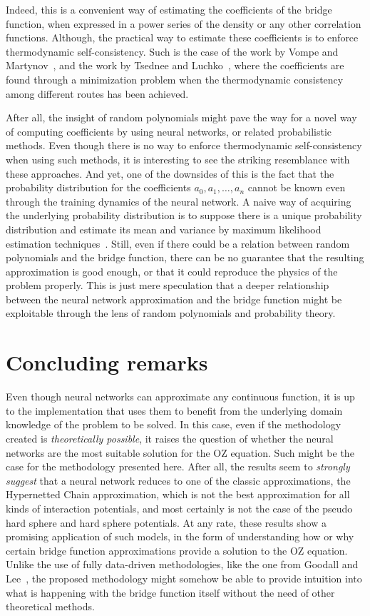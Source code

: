 Indeed, this is a convenient way of estimating the coefficients of the bridge function,
when expressed in a power series of the density or any other correlation functions.
Although, the practical way to estimate these coefficients is to enforce thermodynamic
self-consistency. Such is the case of the work by Vompe and Martynov~\cite{vompeBridgeFunctionExpansion1994},
and the work by Tsednee and Luchko~\cite{tsedneeClosureOrnsteinZernikeEquation2019}, where
the coefficients are found through a minimization problem when the thermodynamic consistency
among different routes has been achieved.

After all, the insight of random polynomials might pave the way for a novel way of 
computing coefficients by using neural networks, or related probabilistic methods.
Even though there is no way to enforce thermodynamic self-consistency when using such
methods, it is interesting to see the striking resemblance with these approaches.
And yet, one of the downsides of this is the fact that the probability
distribution for the coefficients $a_0, a_1, \dots , a_n$ cannot be known even through the
training dynamics of the neural network. A naive way of acquiring the underlying 
probability distribution is to suppose there is
a unique probability distribution and estimate its mean and variance by maximum likelihood
estimation techniques~\cite{hastieElementsStatisticalLearning2009}.
Still, even if there could be a relation between random polynomials and the bridge 
function, there can be no guarantee that the resulting approximation is good enough, or 
that it could reproduce the physics of the problem properly.
This is just mere speculation that a deeper relationship between the neural network 
approximation and the bridge function might be exploitable through the lens of random
polynomials and probability theory.

\section{Concluding remarks}
Even though neural networks can approximate any continuous function,
it is up to the implementation that uses them
to benefit from the underlying domain knowledge of the problem to be solved. In this case,
even if the methodology created is \emph{theoretically possible}, it raises the question of
whether the neural networks are the most suitable solution for the OZ equation.
Such might be the case for the methodology presented here. After all, the results
seem to \emph{strongly suggest} that a neural network reduces to one of the classic 
approximations,
the Hypernetted Chain approximation, which is not the best approximation for all kinds
of interaction potentials, and most certainly is not the case of the pseudo hard sphere
and hard sphere potentials.
At any rate, these results show a promising application of such models, in the form of
understanding how or why certain bridge function approximations provide a solution to the 
OZ equation. Unlike the use of fully data-driven methodologies, like the one from
Goodall and Lee~\cite{a.goodallDatadrivenApproximationsBridge2021},
the proposed methodology might somehow be able to provide intuition into what is happening
with the bridge function itself without the need of other theoretical methods.

